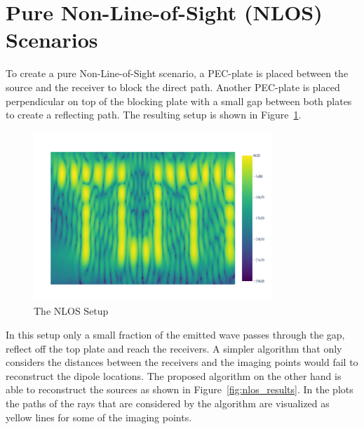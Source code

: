 \section{Pure Non-Line-of-Sight (NLOS) Scenarios}
To create a pure Non-Line-of-Sight scenario, a PEC-plate is placed between the source and the receiver to block the direct path.
Another PEC-plate is placed perpendicular on top of the blocking plate with a small gap between both plates to create a reflecting path.
The resulting setup is shown in Figure~\ref{fig:nlos_setup}.

\begin{figure}[ht]
    \centering
    \includegraphics[page=3, width=0.8\textwidth]{figures/pure_nlos.pdf}
    \caption{The NLOS Setup}\label{fig:nlos_setup}
\end{figure}

In this setup only a small fraction of the emitted wave passes through the gap, reflect off the top plate and reach the receivers.
A simpler algorithm that only considers the distances between the receivers and the imaging points would fail to reconstruct the dipole locations.
The proposed algorithm on the other hand is able to reconstruct the sources as shown in Figure~\ref{fig:nlos_results}.
In the plots the paths of the rays that are considered by the algorithm are visualized as yellow lines for some of the imaging points.

